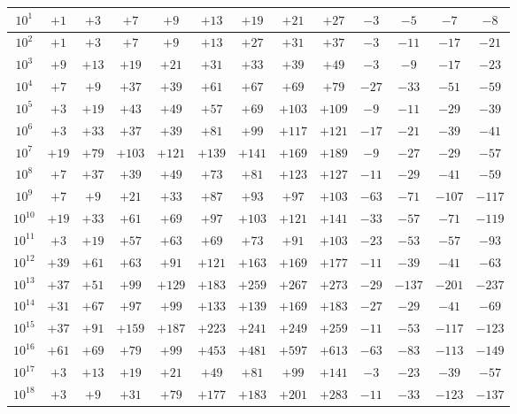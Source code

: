 \documentclass[a4paper,12pt]{article}
\newcommand{\BeginConspect}{
  \pagestyle{fancy}
}
\begin{document}
\renewcommand{\dateseparator}{--}

\BeginConspect

\pagebreak

\begin{tabular}{|c|c|c|c|c|c|c|c|c|c|c|c|c|}
\hline
$10^{1}$ & $+1$ & $+3$ & $+7$ & $+9$ & $+13$ & $+19$ & $+21$ & $+27$ & $-3$ & $-5$ & $-7$ & $-8$ \\
\hline
$10^{2}$ & $+1$ & $+3$ & $+7$ & $+9$ & $+13$ & $+27$ & $+31$ & $+37$ & $-3$ & $-11$ & $-17$ & $-21$ \\
\hline
$10^{3}$ & $+9$ & $+13$ & $+19$ & $+21$ & $+31$ & $+33$ & $+39$ & $+49$ & $-3$ & $-9$ & $-17$ & $-23$ \\
\hline
$10^{4}$ & $+7$ & $+9$ & $+37$ & $+39$ & $+61$ & $+67$ & $+69$ & $+79$ & $-27$ & $-33$ & $-51$ & $-59$ \\
\hline
$10^{5}$ & $+3$ & $+19$ & $+43$ & $+49$ & $+57$ & $+69$ & $+103$ & $+109$ & $-9$ & $-11$ & $-29$ & $-39$ \\
\hline
$10^{6}$ & $+3$ & $+33$ & $+37$ & $+39$ & $+81$ & $+99$ & $+117$ & $+121$ & $-17$ & $-21$ & $-39$ & $-41$ \\
\hline
$10^{7}$ & $+19$ & $+79$ & $+103$ & $+121$ & $+139$ & $+141$ & $+169$ & $+189$ & $-9$ & $-27$ & $-29$ & $-57$ \\
\hline
$10^{8}$ & $+7$ & $+37$ & $+39$ & $+49$ & $+73$ & $+81$ & $+123$ & $+127$ & $-11$ & $-29$ & $-41$ & $-59$ \\
\hline
$10^{9}$ & $+7$ & $+9$ & $+21$ & $+33$ & $+87$ & $+93$ & $+97$ & $+103$ & $-63$ & $-71$ & $-107$ & $-117$ \\
\hline
$10^{10}$ & $+19$ & $+33$ & $+61$ & $+69$ & $+97$ & $+103$ & $+121$ & $+141$ & $-33$ & $-57$ & $-71$ & $-119$ \\
\hline
$10^{11}$ & $+3$ & $+19$ & $+57$ & $+63$ & $+69$ & $+73$ & $+91$ & $+103$ & $-23$ & $-53$ & $-57$ & $-93$ \\
\hline
$10^{12}$ & $+39$ & $+61$ & $+63$ & $+91$ & $+121$ & $+163$ & $+169$ & $+177$ & $-11$ & $-39$ & $-41$ & $-63$ \\
\hline
$10^{13}$ & $+37$ & $+51$ & $+99$ & $+129$ & $+183$ & $+259$ & $+267$ & $+273$ & $-29$ & $-137$ & $-201$ & $-237$ \\
\hline
$10^{14}$ & $+31$ & $+67$ & $+97$ & $+99$ & $+133$ & $+139$ & $+169$ & $+183$ & $-27$ & $-29$ & $-41$ & $-69$ \\
\hline
$10^{15}$ & $+37$ & $+91$ & $+159$ & $+187$ & $+223$ & $+241$ & $+249$ & $+259$ & $-11$ & $-53$ & $-117$ & $-123$ \\
\hline
$10^{16}$ & $+61$ & $+69$ & $+79$ & $+99$ & $+453$ & $+481$ & $+597$ & $+613$ & $-63$ & $-83$ & $-113$ & $-149$ \\
\hline
$10^{17}$ & $+3$ & $+13$ & $+19$ & $+21$ & $+49$ & $+81$ & $+99$ & $+141$ & $-3$ & $-23$ & $-39$ & $-57$ \\
\hline
$10^{18}$ & $+3$ & $+9$ & $+31$ & $+79$ & $+177$ & $+183$ & $+201$ & $+283$ & $-11$ & $-33$ & $-123$ & $-137$ \\
\hline
\end{tabular}
\end{document}
